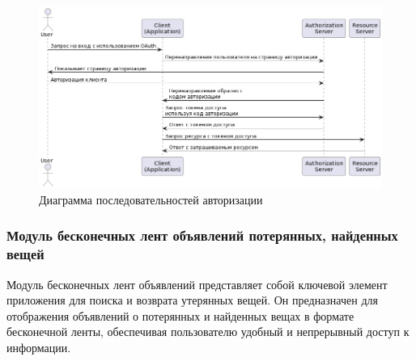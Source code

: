 \begin{figure}[htb]
	\centering
	\includegraphics[width=.9\textwidth]{images/registation-diagram.png}
	\parskip=6pt
	\caption{Диаграмма последовательностей авторизации}
	\label{fig:authDiagram}
\end{figure}

\subsubsection{Модуль бесконечных лент объявлений потерянных, найденных вещей}

Модуль бесконечных лент объявлений представляет собой ключевой элемент приложения для поиска и возврата утерянных вещей. Он предназначен для отображения объявлений о потерянных и найденных вещах в формате бесконечной ленты, обеспечивая пользователю удобный и непрерывный доступ к информации.

